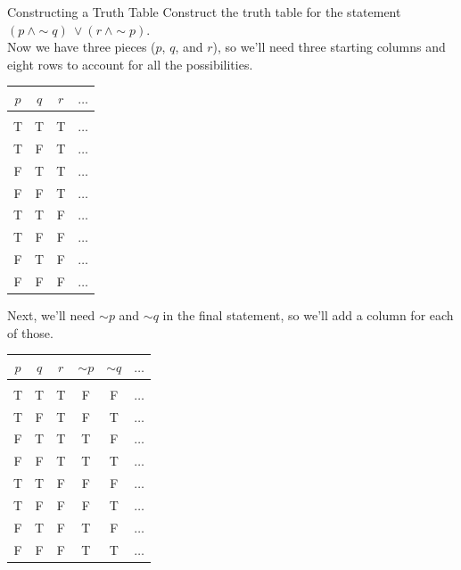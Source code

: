 \begin{example}[https://www.youtube.com/watch?v=Sdh658OUmFk]{Constructing a Truth Table}
Construct the truth table for the statement $(p\ \wedge \sim q)\ \vee (r\ \wedge \sim p)$.\\

\sol
Now we have three pieces ($p$, $q$, and $r$), so we'll need three starting columns and eight rows to account for all the possibilities.
\begin{center}
\begin{tabular}{|c c c c|}
\hline
$p$ & $q$ & $r$ & $\ldots$\\
\hline
& & &\\
T & T & T & $\ldots$\\
T & F & T & $\ldots$\\
F & T & T & $\ldots$\\
F & F & T & $\ldots$\\
T & T & F & $\ldots$\\
T & F & F & $\ldots$\\
F & T & F & $\ldots$\\
F & F & F & $\ldots$\\
\hline
\end{tabular}
\end{center}

Next, we'll need $\sim p$ and $\sim q$ in the final statement, so we'll add a column for each of those.
\begin{center}
\begin{tabular}{|c c c c c c|}
\hline
$p$ & $q$ & $r$ & $\sim p$ & $\sim q$ & $\ldots$\\
\hline
& & & & &\\
T & T & T & F & F & $\ldots$\\
T & F & T & F & T & $\ldots$\\
F & T & T & T & F & $\ldots$\\
F & F & T & T & T & $\ldots$\\
T & T & F & F & F & $\ldots$\\
T & F & F & F & T & $\ldots$\\
F & T & F & T & F & $\ldots$\\
F & F & F & T & T & $\ldots$\\
\hline
\end{tabular}
\end{center}
\vfill
\pagebreak


\end{example}
